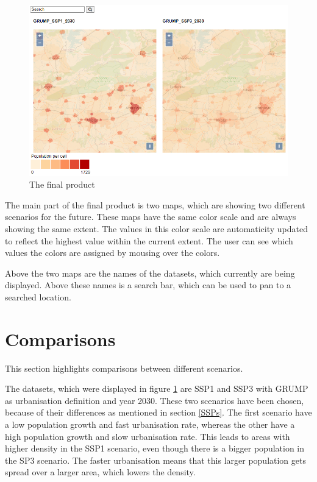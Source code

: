 \begin{figure} [H]
	\centering
	\includegraphics[width=.8\textwidth]{Pictures/FinalProduct}
	\caption{The final product}
	\label{FinalProduct}
\end{figure}

The main part of the final product is two maps, which are showing two different scenarios for the future. These maps have the same color scale and are always showing the same extent. The values in this color scale are automaticity updated to reflect the highest value within the current extent. The user can see which values the colors are assigned by mousing over the colors. 

Above the two maps are the names of the datasets, which currently are being displayed. Above these names is a search bar, which can be used to pan to a searched location.  
\section{Comparisons}\label{Comparisons}
This section highlights comparisons between different scenarios. 

The datasets, which were displayed in figure \ref{FinalProduct} are SSP1 and SSP3 with GRUMP as urbanisation definition and year 2030. These two scenarios have been chosen, because of their differences as mentioned in section \ref{SSPs}. The first scenario have a low population growth and fast urbanisation rate, whereas the other have a high population growth and slow urbanisation rate. This leads to areas with higher density in the SSP1 scenario, even though there is a bigger population in the SP3 scenario. The faster urbanisation means that this larger population gets spread over a larger area, which lowers the density.

